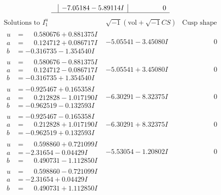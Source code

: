\documentclass[1p]{elsarticle_modified}
\theoremstyle{definition}
\newcommand{\I}{\sqrt{-1}}
\begin{document}
$$\begin{array}{c|c|c}
 & -7.05184 - 5.89114 I & \phantom{-0.000000 } 0\\
 \hline 
 \end{array}$$\newpage$$\begin{array}{c|c|c}  
\text{Solutions to }I^u_{1}& \I (\text{vol} + \sqrt{-1}CS) & \text{Cusp shape}\\
 \hline 
\begin{aligned}
u &= \phantom{-}0.580676 + 0.881375 I \\
a &= \phantom{-}0.124712 + 0.086717 I \\
b &= -0.316735 - 1.354540 I\end{aligned}
 & -5.05541 - 3.45080 I & \phantom{-0.000000 } 0 \\ \hline\begin{aligned}
u &= \phantom{-}0.580676 - 0.881375 I \\
a &= \phantom{-}0.124712 - 0.086717 I \\
b &= -0.316735 + 1.354540 I\end{aligned}
 & -5.05541 + 3.45080 I & \phantom{-0.000000 } 0 \\ \hline\begin{aligned}
u &= -0.925467 + 0.165358 I \\
a &= \phantom{-}0.212828 - 1.017190 I \\
b &= -0.962519 - 0.132593 I\end{aligned}
 & -6.30291 - 8.32375 I & \phantom{-0.000000 } 0 \\ \hline\begin{aligned}
u &= -0.925467 - 0.165358 I \\
a &= \phantom{-}0.212828 + 1.017190 I \\
b &= -0.962519 + 0.132593 I\end{aligned}
 & -6.30291 + 8.32375 I & \phantom{-0.000000 } 0 \\ \hline\begin{aligned}
u &= \phantom{-}0.598860 + 0.721099 I \\
a &= -2.31654 - 0.04429 I \\
b &= \phantom{-}0.490731 - 1.112850 I\end{aligned}
 & -5.53054 - 1.20802 I & \phantom{-0.000000 } 0 \\ \hline\begin{aligned}
u &= \phantom{-}0.598860 - 0.721099 I \\
a &= -2.31654 + 0.04429 I \\
b &= \phantom{-}0.490731 + 1.112850 I\end{aligned}

\end{array}$$
\end{document}
